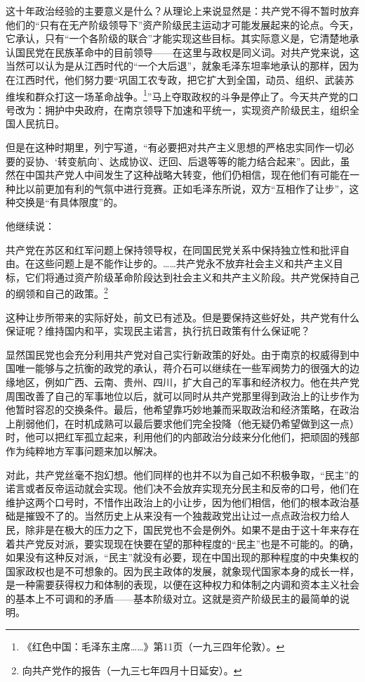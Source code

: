 \documentclass[10pt]{book}
\begin{document}
这十年政治经验的主要意义是什么？从理论上来说显然是：共产党不得不暂时放弃他们的“只有在无产阶级领导下”资产阶级民主运动才可能发展起来的论点。今天，它承认，只有“一个各阶级的联合”才能实现这些目标。其实际意义是，它清楚地承认国民党在民族革命中的目前领导——在这里与政权是同义词。对共产党来说，这当然可以认为是从江西时代的“一个大后退”，就象毛泽东坦率地承认的那样，因为在江西时代，他们努力要“巩固工农专政，把它扩大到全国，动员、组织、武装苏维埃和群众打这一场革命战争。\footnote{《红色中国：毛泽东主席……》第11页（一九三四年伦敦）。}”马上夺取政权的斗争是停止了。今天共产党的口号改为：拥护中央政府，在南京领导下加速和平统一，实现资产阶级民主，组织全国人民抗日。

但是在这种时期里，列宁写道，“有必要把对共产主义思想的严格忠实同作一切必要的妥协、‘转变航向’、达成协议、迂回、后退等等的能力结合起来”。因此，虽然在中国共产党人中间发生了这种战略大转变，他们仍相信，现在他们有可能在一种比以前更加有利的气氛中进行竞赛。正如毛泽东所说，双方“互相作了让步”，这种交换是“有具体限度”的。

他继续说：

共产党在苏区和红军问题上保持领导权，在同国民党关系中保持独立性和批评自由。在这些问题上是不能作让步的。……共产党永不放弃社会主义和共产主义目标，它们将通过资产阶级革命阶段达到社会主义和共产主义阶段。共产党保持自己的纲领和自己的政策。\footnote{向共产党作的报告（一九三七年四月十日延安）。}

这种让步所带来的实际好处，前文已有述及。但是要保持这些好处，共产党有什么保证呢？维持国内和平，实现民主诺言，执行抗日政策有什么保证呢？

显然国民党也会充分利用共产党对自己实行新政策的好处。由于南京的权威得到中国唯一能够与之抗衡的政党的承认，蒋介石可以继续在一些军阀势力的很强大的边缘地区，例如广西、云南、贵州、四川，扩大自己的军事和经济权力。他在共产党周围改善了自己的军事地位以后，就可以同时从共产党那里得到政治上的让步作为他暂时容忍的交换条件。最后，他希望靠巧妙地兼而采取政治和经济策略，在政治上削弱他们，在时机成熟可以最后要求他们完全投降（他无疑仍希望做到这一点）时，他可以把红军孤立起来，利用他们的内部政治分歧来分化他们，把顽固的残部作为纯粹地方军事问题来加以解决。

对此，共产党丝毫不抱幻想。他们同样的也并不以为自己如不积极争取，“民主”的诺言或者反帝运动就会实现。他们决不会放弃实现充分民主和反帝的口号，他们在维护这两个口号时，不惜作出政治上的小让步，因为他们相信，他们的根本政治基础是摧毁不了的。当然历史上从来没有一个独裁政党出让过一点点政治权力给人民，除非是在极大的压力之下，国民党也不会是例外。如果不是由于这十年来存在着共产党反对派，要实现现在快要在望的那种程度的“民主”也是不可能的。的确，如果没有这种反对派，“民主”就没有必要，现在中国出现的那种程度的中央集权的国家政权也是不可想象的。因为民主政体的发展，就象现代国家本身的成长一样，是一种需要获得权力和体制的表现，以便在这种权力和体制之内调和资本主义社会的基本上不可调和的矛盾——基本阶级对立。这就是资产阶级民主的最简单的说明。
\end{document}
